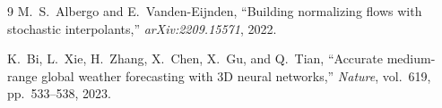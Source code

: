 \documentclass[11pt]{article}
\begin{document}
\begin{thebibliography}{9}
  M.~S.\ Albergo and E.\ Vanden-Eijnden,
  ``Building normalizing flows with stochastic interpolants,''
  \textit{arXiv:2209.15571}, 2022.

  K.\ Bi, L.\ Xie, H.\ Zhang, X.\ Chen, X.\ Gu, and Q.\ Tian,
  ``Accurate medium-range global weather forecasting with 3D neural networks,''
  \textit{Nature}, vol.\ 619, pp.\ 533--538, 2023.
\end{thebibliography}
\end{document}
